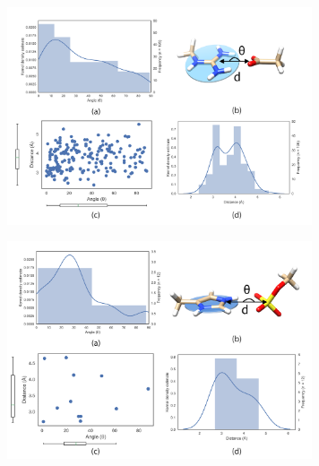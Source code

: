 \documentclass[a4paper, 12pt, openany]{book}
\begin{document}
\begin{figure}
    \centering
    \includegraphics[width=9cm]{Figures/Datamining/arg_carb.png}
    \caption{
    }
    \label{fig:my_label}
\end{figure}

\begin{figure}
    \centering
    \includegraphics[width=9cm]{Figures/Datamining/hist_sulfate.png}
    \caption{
    }
    \label{fig:my_label}
\end{figure}
\end{document}

